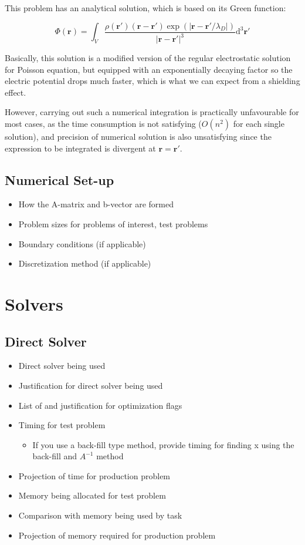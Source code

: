 \documentclass{article}
\begin{document}
\begin{spacing}{1.1}
This problem has an analytical solution, which is based on its Green function:

\[ \Phi(\mathbf{r}) = \int _V \frac{\rho(\mathbf{r'}) (\mathbf{r} - \mathbf{r'}) \exp(|\mathbf{r} - \mathbf{r'} / \lambda_D|)}{|\mathbf{r} - \mathbf{r'}|^3} \mathrm{d}^3 \mathbf{r'}\]

Basically, this solution is a modified version of the regular electrostatic solution for Poisson equation, but equipped with an exponentially decaying factor so the electric potential drops much faster, which is what we can expect from a shielding effect.

However, carrying out such a numerical integration is practically unfavourable for most cases, as the time consumption is not satisfying ($ O(n^2) $ for each single solution), and precision of numerical solution is also unsatisfying since the expression to be integrated is divergent at $\mathbf{r} = \mathbf{r'}$.

\subsection{Numerical Set-up}

\begin{itemize}
    \item How the A-matrix and b-vector are formed
    \item Problem sizes for problems of interest, test problems
    \item Boundary conditions (if applicable)
    \item Discretization method (if applicable) 
\end{itemize}

\section{Solvers}

\subsection{Direct Solver}

\begin{itemize}
    \item Direct solver being used     
    \item Justification for direct solver being used
    \item List of and justification for optimization flags 
    \item Timing for test problem 
    \begin{itemize}
        \item If you use a back-fill type method, provide timing for finding x using the back-fill and $A^{-1}$ method
    \end{itemize}
    \item Projection of time for production problem
    \item Memory being allocated for test problem
    \item Comparison with memory being used by task
    \item Projection of memory required for production problem
\end{itemize}


\end{spacing}
\end{document}
